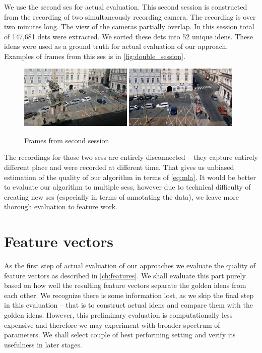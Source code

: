 We use the second \gls{ses} for actual evaluation. This second session is
constructed from the recording of two simultaneously recording camera. The
recording is over two minutes long. The view of the cameras partially overlap.
In this session total of 147,681 \glspl{det} were extracted. We sorted these
\glspl{det} into 52 unique \glspl{iden}. These \glspl{iden} were used as a
ground truth for actual evaluation of our approach. Examples of frames from
this \gls{ses} is in \autoref{fig:double_session}.

\begin{figure}
    \centering
    \includegraphics[width=0.48\textwidth]{img/frame_double_session_1_smaller.png}
    \includegraphics[width=0.48\textwidth]{img/frame_double_session_2_smaller.png}
    \caption{Frames from second session}
    \label{fig:double_session}
\end{figure}

The recordings for those two \glspl{ses} are entirely disconnected -- they
capture entirely different place and were recorded at different time. That gives
us unbiased estimation of the quality of our algorithm in terms of
\autoref{eq:mla}. It would be better to evaluate our algorithm to multiple
\glspl{ses}, however due to technical difficulty of creating new \gls{ses}
(especially in terms of annotating the data), we leave more thorough evaluation
to feature work.

\section{Feature vectors}

As the first step of actual evaluation of our approaches we evaluate the
quality of feature vectors as described in \autoref{ch:features}. We shall
evaluate this part purely based on how well the resulting feature vectors
separate the golden \glspl{iden} from each other. We recognize there is some
information lost, as we skip the final step in this evaluation -- that is to
construct actual \glspl{iden} and compare them with the golden \glspl{iden}.
However, this preliminary evaluation is computationally less expensive and
therefore we may experiment with broader spectrum of parameters. We shall
select couple of best performing setting and verify its usefulness in later
stages.

